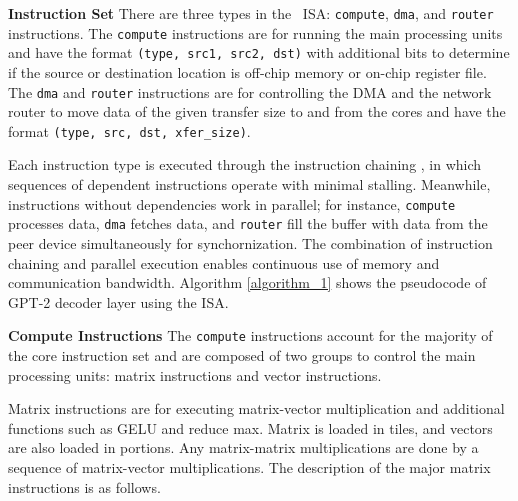 \textbf{Instruction Set}
There are three types in the \sysname~ISA: \texttt{compute}, \texttt{dma}, and \texttt{router} instructions. The \texttt{compute} instructions are for running the main processing units and have the format \texttt{(type, src1, src2, dst)} with additional bits to determine if the source or destination location is off-chip memory or on-chip register file. The \texttt{dma} and \texttt{router} instructions are for controlling the DMA and the network router to move data of the given transfer size to and from the cores and have the format \texttt{(type, src, dst, xfer\_size)}.

Each instruction type is executed through the instruction chaining \cite{fowers2018configurable}, in which sequences of
dependent instructions operate with minimal stalling. Meanwhile, instructions without dependencies work in parallel; for instance, \texttt{compute} processes data, \texttt{dma} fetches data, and \texttt{router} fill the buffer with data from the peer device simultaneously for synchornization. The combination of instruction chaining and parallel execution enables continuous use of memory and communication bandwidth. Algorithm \ref{algorithm_1} shows the pseudocode of GPT-2 decoder layer using the ISA.

\textbf{Compute Instructions}
The \texttt{compute} instructions account for the majority of the core instruction set and are composed of two groups to control the main processing units: matrix instructions and vector instructions.

Matrix instructions are for executing matrix-vector multiplication and additional functions such as GELU and reduce max. Matrix is loaded in tiles, and vectors are also loaded in portions. Any matrix-matrix multiplications are done by a sequence of matrix-vector multiplications. The description of the major matrix instructions is as follows.

